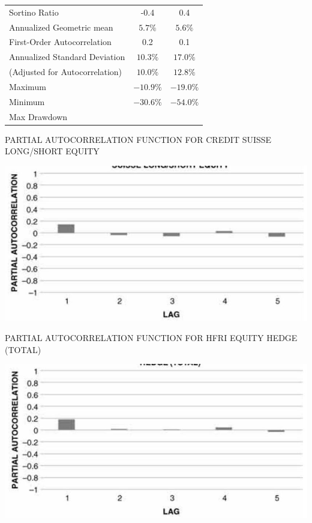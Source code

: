 \documentclass[11pt]{article}
\begin{document}
\begin{center}
\begin{tabular}{lcc}
Sortino Ratio & -0.4 & 0.4 \\
Annualized Geometric mean & $5.7 \%$ & $5.6 \%$ \\
First-Order Autocorrelation & 0.2 & 0.1 \\
Annualized Standard Deviation & $10.3 \%$ & $17.0 \%$ \\
(Adjusted for Autocorrelation) & $10.0 \%$ & $12.8 \%$ \\
Maximum & $-10.9 \%$ & $-19.0 \%$ \\
Minimum & $-30.6 \%$ & $-54.0 \%$ \\
Max Drawdown &  &  \\
\end{tabular}
\end{center}

PARTIAL AUTOCORRELATION FUNCTION FOR CREDIT SUISSE LONG/SHORT EQUITY

\begin{center}
\includegraphics[max width=\textwidth]{2024_04_09_92122b5eb0776b473e03g-5}
\end{center}

PARTIAL AUTOCORRELATION FUNCTION FOR HFRI EQUITY HEDGE (TOTAL)

\begin{center}
\includegraphics[max width=\textwidth]{2024_04_09_92122b5eb0776b473e03g-5(1)}
\end{center}
\end{document}

